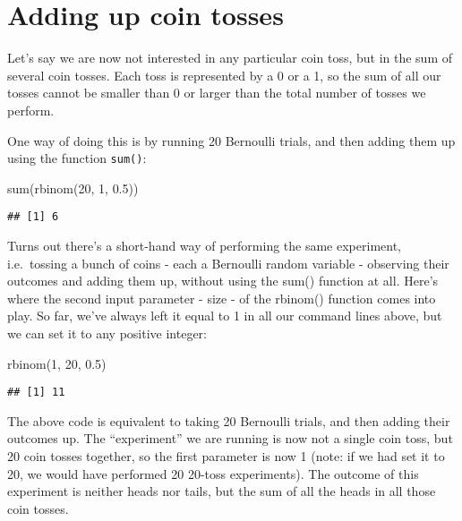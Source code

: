 \documentclass[
]{book}
\newenvironment{Shaded}{\begin{snugshade}}{\end{snugshade}}
\newcommand{\DecValTok}[1]{\textcolor[rgb]{0.00,0.00,0.81}{#1}}
\newcommand{\FloatTok}[1]{\textcolor[rgb]{0.00,0.00,0.81}{#1}}
\newcommand{\FunctionTok}[1]{\textcolor[rgb]{0.00,0.00,0.00}{#1}}
\newcommand{\NormalTok}[1]{#1}
\begin{document}
\hypertarget{adding-up-coin-tosses}{%
\section{Adding up coin tosses}\label{adding-up-coin-tosses}}

Let's say we are now not interested in any particular coin toss, but in the sum of several coin tosses. Each toss is represented by a 0 or a 1, so the sum of all our tosses cannot be smaller than 0 or larger than the total number of tosses we perform.

One way of doing this is by running 20 Bernoulli trials, and then adding them up using the function \texttt{sum()}:

\begin{Shaded}
\begin{Highlighting}[]
\FunctionTok{sum}\NormalTok{(}\FunctionTok{rbinom}\NormalTok{(}\DecValTok{20}\NormalTok{, }\DecValTok{1}\NormalTok{, }\FloatTok{0.5}\NormalTok{))}
\end{Highlighting}
\end{Shaded}

\begin{verbatim}
## [1] 6
\end{verbatim}

Turns out there's a short-hand way of performing the same experiment, i.e.~tossing a bunch of coins - each a Bernoulli random variable - observing their outcomes and adding them up, without using the sum() function at all. Here's where the second input parameter - size - of the rbinom() function comes into play. So far, we've always left it equal to 1 in all our command lines above, but we can set it to any positive integer:

\begin{Shaded}
\begin{Highlighting}[]
\FunctionTok{rbinom}\NormalTok{(}\DecValTok{1}\NormalTok{, }\DecValTok{20}\NormalTok{, }\FloatTok{0.5}\NormalTok{)}
\end{Highlighting}
\end{Shaded}

\begin{verbatim}
## [1] 11
\end{verbatim}

The above code is equivalent to taking 20 Bernoulli trials, and then adding their outcomes up. The ``experiment'' we are running is now not a single coin toss, but 20 coin tosses together, so the first parameter is now 1 (note: if we had set it to 20, we would have performed 20 20-toss experiments). The outcome of this experiment is neither heads nor tails, but the sum of all the heads in all those coin tosses.
\end{document}
